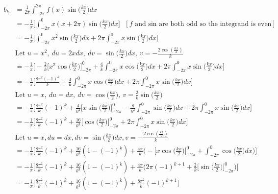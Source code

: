\documentclass{article}
\begin{document}
\begin{enumerate}
\begin{enumerate}
\begin{align*}
    b_k &= \frac{1}{2\pi} \int_{-2\pi}^{2\pi}f(x)\sin\Big(\frac{kx}{2}\Big) dx \\
    &=- \frac{1}{\pi} \Bigg[ \int_{-2\pi}^{0}x(x+2\pi)\sin\Big(\frac{kx}{2}\Big) dx \Bigg] \: \: \:  [\text{$f$ and sin are both odd so the integrand is even}]\\
    &=- \frac{1}{\pi} \Bigg[ \int_{-2\pi}^{0}x^2\sin\Big(\frac{kx}{2}\Big) dx + 2\pi \int_{-2\pi}^{0}x\sin\Big(\frac{kx}{2}\Big) dx \Bigg] \\
    &\text{Let }u = x^2, \: du = 2xdx, \: dv = \sin\Big(\frac{kx}{2}\Big) dx,\: v = -\frac{2\cos(\frac{kx}{2})}{k} \\
    &=- \frac{1}{\pi} \Bigg[ -\frac{2}{k}\Big[x^2\cos\Big(\frac{kx}{2}\Big) \Big]_{-2\pi}^{0} + \frac{4}{k}\int_{-2\pi}^{0}x\cos\Big(\frac{kx}{2}\Big)dx + 2\pi \int_{-2\pi}^{0}x\sin\Big(\frac{kx}{2}\Big) dx \Bigg] \\
    &=- \frac{1}{\pi} \Bigg[ \frac{8\pi^2(-1)^k}{k} + \frac{4}{k}\int_{-2\pi}^{0}x\cos\Big(\frac{kx}{2}\Big)dx + 2\pi \int_{-2\pi}^{0}x\sin\Big(\frac{kx}{2}\Big) dx \Bigg] \\
    &\text{Let } u = x,\: du = dx,\: dv = \cos\Big(\frac{kx}{2}\Big),\: v = \frac{2}{k}\sin\Big(\frac{kx}{2}\Big) \\
    &=- \frac{1}{\pi} \Bigg[ \frac{8\pi^2}{k}(-1)^k + \frac{4}{k^2}\Big[x\sin\Big(\frac{kx}{2}\Big) \Big]_{-2\pi}^{0} - \frac{8}{k^2}\int_{-2\pi}^{0}\sin\Big(\frac{kx}{2}\Big) dx + 2\pi \int_{-2\pi}^{0}x\sin\Big(\frac{kx}{2}\Big) dx \Bigg] \\
    &=- \frac{1}{\pi} \Bigg[ \frac{8\pi^2}{k}(-1)^k + \frac{16}{k^3}\Big[ \cos\Big(\frac{kx}{2}\Big) \Big]_{-2\pi}^{0} + 2\pi \int_{-2\pi}^{0}x\sin\Big(\frac{kx}{2}\Big) dx \Bigg] \\
    &\text{Let $u = x, du = dx, dv = \sin\Big(\frac{kx}{2}\Big) dx, v = -\frac{2\cos(\frac{kx}{2})}{k}$} \\
    &=- \frac{1}{\pi} \Bigg[ \frac{8\pi^2}{k}(-1)^k + \frac{16}{k^3}(1 - (-1)^k) + \frac{4\pi}{k} \Big( -\Big[x\cos\Big(\frac{kx}{2}\Big)\Big]_{-2\pi}^{0} + \int_{-2\pi}^{0}\cos\Big(\frac{kx}{2}\Big) dx \Big) \Bigg] \\
    &=- \frac{1}{\pi} \Bigg[ \frac{8\pi^2}{k}(-1)^k + \frac{16}{k^3}(1 - (-1)^k) + \frac{4\pi}{k} \Big(  2\pi(-1)^{k+1} + \frac{2}{k}\Big[\sin\Big(\frac{kx}{2}\Big)\Big]_{-2\pi}^{0} \Big) \Bigg] \\
    &=- \frac{1}{\pi} \Bigg[ \frac{8\pi^2}{k}(-1)^k + \frac{16}{k^3}(1 - (-1)^k) + \frac{8\pi^2}{k}(-1)^{k+1} \Bigg] \\

\end{align*}
\end{enumerate}
\end{enumerate}
\end{document}
